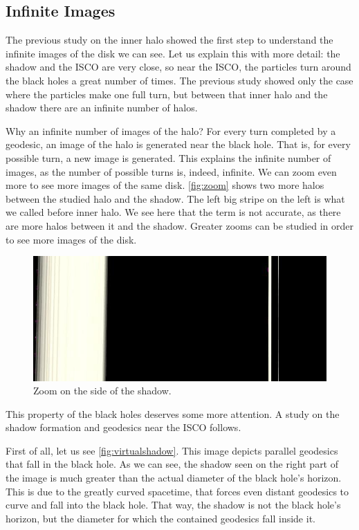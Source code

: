 \subsection{Infinite Images}

The previous study on the inner halo showed the first step to understand the infinite images of the disk we can see. Let us explain this with more detail: the shadow and the \ac{ISCO} are very close, so near the \ac{ISCO}, the particles turn around the black holes a great number of times. The previous study showed only the case where the particles make one full turn, but between that inner halo and the shadow there are an infinite number of halos.

Why an infinite number of images of the halo? For every turn completed by a geodesic, an image of the halo is generated near the black hole. That is, for every possible turn, a new image is generated. This explains the infinite number of images, as the number of possible turns is, indeed, infinite. We can zoom even more to see more images of the same disk. \autoref{fig:zoom} shows two more halos between the studied halo and the shadow. The left big stripe on the left is what we called before inner halo. We see here that the term is not accurate, as there are more halos between it and the shadow. Greater zooms can be studied in order to see more images of the disk.

\begin{figure}[bth]
	\myfloatalign
	\includegraphics[width=.7\linewidth]{gfx/zoom}
	\caption[Zoom on the side of the shadow]{Zoom on the side of the shadow.}
	\label{fig:zoom}
\end{figure}

This property of the black holes deserves some more attention. A study on the shadow formation and geodesics near the \ac{ISCO} follows.

First of all, let us see \autoref{fig:virtualshadow}. This image depicts parallel geodesics that fall in the black hole. As we can see, the shadow seen on the right part of the image is much greater than the actual diameter of the black hole's horizon. This is due to the greatly curved spacetime, that forces even distant geodesics to curve and fall into the black hole. That way, the shadow is not the black hole's horizon, but the diameter for which the contained geodesics fall inside it.

